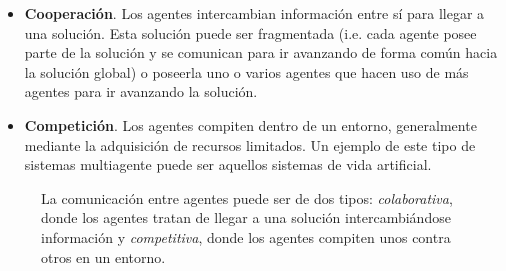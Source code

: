 \begin{itemize}
	\item \textbf{Cooperación}. Los agentes intercambian información entre sí para llegar a una solución. Esta solución puede ser fragmentada (i.e. cada agente posee parte de la solución y se comunican para ir avanzando de forma común hacia la solución global) o poseerla uno o varios agentes que hacen uso de más agentes para ir avanzando la solución.
	\item \textbf{Competición}. Los agentes compiten dentro de un entorno, generalmente mediante la adquisición de recursos limitados. Un ejemplo de este tipo de sistemas multiagente puede ser aquellos sistemas de vida artificial.
\end{itemize}

\begin{figure}
	\caption[Diferencias entre colaboración y competitividad de agentes]{La comunicación entre agentes puede ser de dos tipos: \textit{colaborativa}, donde los agentes tratan de llegar a una solución intercambiándose información y \textit{competitiva}, donde los agentes compiten unos contra otros en un entorno.}
	\label{fig:communication-between-agents-in-mass}
\end{figure}

